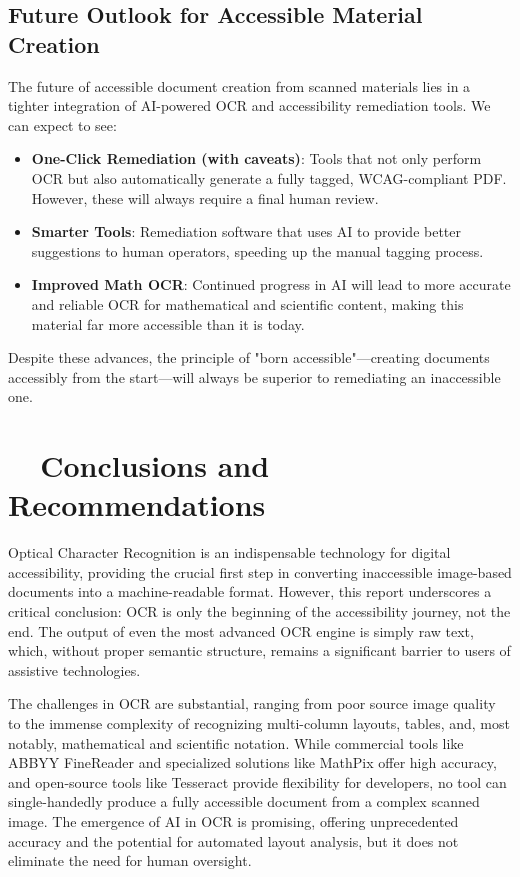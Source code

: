 \subsection{Future Outlook for Accessible Material Creation}
\label{subsec:ocr-future-outlook}
The future of accessible document creation from scanned materials lies in a tighter integration of AI-powered OCR and accessibility remediation tools. We can expect to see:
\begin{itemize}
	\item \textbf{One-Click Remediation (with caveats)}: Tools that not only perform OCR but also automatically generate a fully tagged, WCAG-compliant PDF. However, these will always require a final human review.
	\item \textbf{Smarter Tools}: Remediation software that uses AI to provide better suggestions to human operators, speeding up the manual tagging process.
	\item \textbf{Improved Math OCR}: Continued progress in AI will lead to more accurate and reliable OCR for mathematical and scientific content, making this material far more accessible than it is today.
\end{itemize}
Despite these advances, the principle of "born accessible"—creating documents accessibly from the start—will always be superior to remediating an inaccessible one.

\section{~~Conclusions and Recommendations}
\label{sec:ocr-conclusion}
Optical Character Recognition is an indispensable technology for digital accessibility, providing the crucial first step in converting inaccessible image-based documents into a machine-readable format. However, this report underscores a critical conclusion: OCR is only the beginning of the accessibility journey, not the end. The output of even the most advanced OCR engine is simply raw text, which, without proper semantic structure, remains a significant barrier to users of assistive technologies.

The challenges in OCR are substantial, ranging from poor source image quality to the immense complexity of recognizing multi-column layouts, tables, and, most notably, mathematical and scientific notation. While commercial tools like ABBYY FineReader and specialized solutions like MathPix offer high accuracy, and open-source tools like Tesseract provide flexibility for developers, no tool can single-handedly produce a fully accessible document from a complex scanned image. The emergence of AI in OCR is promising, offering unprecedented accuracy and the potential for automated layout analysis, but it does not eliminate the need for human oversight.

